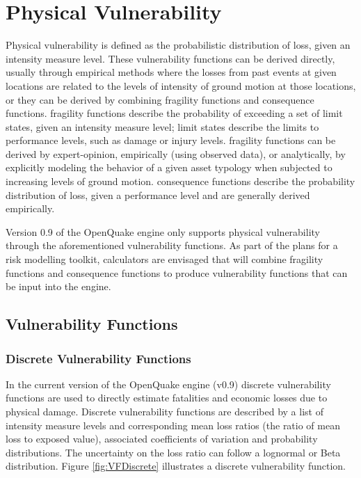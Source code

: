 \section{Physical Vulnerability}
Physical vulnerability is defined as the probabilistic distribution of loss, given an intensity measure level. These \glspl{vulnerability function} can be derived directly, usually through empirical methods where the losses from past events at given locations are related to the levels of intensity of ground motion at those locations, or they can be derived by combining \glspl{fragility function} and \glspl{consequence function}. \Glspl{fragility function} describe the probability of exceeding a set of limit states, given an intensity measure level; limit states describe the limits to performance levels, such as damage or injury levels. \Glspl{fragility function} can be derived by expert-opinion, empirically (using observed data), or analytically, by explicitly modeling the behavior of a given asset typology when subjected to increasing levels of ground motion. \Glspl{consequence function} describe the probability distribution of loss, given a performance level and are generally derived empirically. 

Version 0.9 of the OpenQuake engine only supports physical vulnerability through the aforementioned \glspl{vulnerability function}. As part of the plans for a risk modelling toolkit, calculators are envisaged that will combine \glspl{fragility function} and \glspl{consequence function} to produce \glspl{vulnerability function} that can be input into the engine. 

\subsection{Vulnerability Functions}
\subsubsection{Discrete Vulnerability Functions}
In the current version of the OpenQuake engine (v0.9) discrete \glspl{vulnerability function} are used to directly estimate fatalities and economic losses due to physical damage. Discrete \glspl{vulnerability function} are described by a list of intensity measure levels and corresponding mean loss ratios (the ratio of mean loss to exposed value), associated coefficients of variation and probability distributions. The uncertainty on the loss ratio can follow a lognormal or Beta distribution. Figure \ref{fig:VFDiscrete} illustrates a discrete \gls{vulnerability function}.

